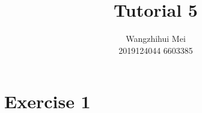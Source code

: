 \documentclass[12pt]{article}%
\begin{document}
\title{Tutorial 5}
\author{Wangzhihui Mei \\ 2019124044 6603385}
\date{}
\maketitle

\section*{Exercise 1}
\end{document}
